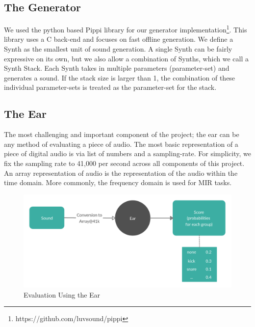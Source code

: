 \documentclass{nime-alternate} %
\begin{document}
\subsection{The Generator}
We used the python based Pippi library for our generator implementation\footnote{https://github.com/luvsound/pippi}. This library uses a C back-end and focuses on fast offline generation. We define a Synth as the smallest unit of sound generation. A single Synth can be fairly expressive on its own, but we also allow a combination of Synths, which we call a Synth Stack. Each Synth takes in multiple parameters (parameter-set) and generates a sound. If the stack size is larger than 1, the combination of these individual parameter-sets is treated as the parameter-set for the stack. 

\subsection{The Ear}
The most challenging and important component of the project; the ear can be any method of evaluating a piece of audio. The most basic representation of a piece of digital audio is via list of numbers and a sampling-rate. For simplicity, we fix the sampling rate to 41,000 per second across all components of this project. An array representation of audio is the representation of the audio within the time domain. More commonly, the frequency domain is used for MIR tasks.
\begin{figure}[H]
\centering
\includegraphics[width=\textwidth]{images/SSS_ear.png}
\caption{Evaluation Using the Ear}
\label{fig:SSS generator}
\end{figure}
\end{document}
